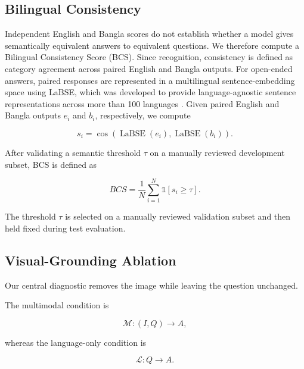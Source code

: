 \documentclass{article}
\begin{document}
\subsection{Bilingual Consistency}
\label{subsec:bilingual_consistency}

Independent English and Bangla scores do not establish whether a model gives semantically equivalent answers to equivalent questions. We therefore compute a Bilingual Consistency Score (BCS). Since recognition, consistency is defined as category agreement across paired English and Bangla outputs. For open-ended answers, paired responses are represented in a multilingual sentence-embedding space using LaBSE, which was developed to provide language-agnostic sentence representations across more than 100 languages \citep{feng2022labse}. Given paired English and Bangla outputs $e_i$ and $b_i$, respectively, we compute

\begin{equation}
s_i =
\cos
\left(
\operatorname{LaBSE}(e_i),
\operatorname{LaBSE}(b_i)
\right).
\label{eq:labse_similarity}
\end{equation}

After validating a semantic threshold $\tau$ on a manually reviewed development subset, BCS is defined as

\begin{equation}
BCS
=
\frac{1}{N}
\sum_{i=1}^{N}
\mathbb{1}
\left[
s_i \geq \tau
\right].
\label{eq:bcs}
\end{equation}

The threshold $\tau$ is selected on a manually reviewed validation subset and then held fixed during test evaluation.

\subsection{Visual-Grounding Ablation}
\label{subsec:grounding_ablation}

Our central diagnostic removes the image while leaving the question unchanged.

The multimodal condition is

\begin{equation}
\mathcal{M}:
(I,Q)
\rightarrow
A,
\label{eq:multimodal_condition}
\end{equation}

whereas the language-only condition is

\begin{equation}
\mathcal{L}:
Q
\rightarrow
A.
\label{eq:language_condition}
\end{equation}
\end{document}

